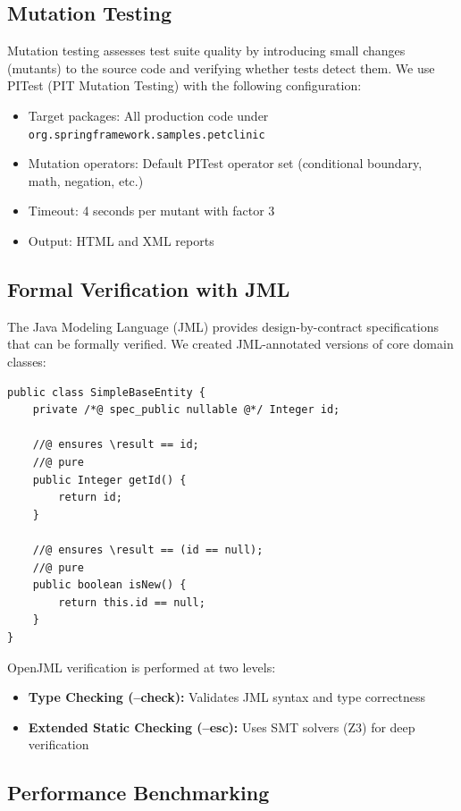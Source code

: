 \documentclass[sigconf]{acmart}
\begin{document}
\subsection{Mutation Testing}

Mutation testing assesses test suite quality by introducing small changes (mutants) to the source code and verifying whether tests detect them. We use PITest (PIT Mutation Testing) with the following configuration:
\begin{itemize}
    \item Target packages: All production code under \texttt{org.springframework.samples.petclinic}
    \item Mutation operators: Default PITest operator set (conditional boundary, math, negation, etc.)
    \item Timeout: 4 seconds per mutant with factor 3
    \item Output: HTML and XML reports
\end{itemize}

\subsection{Formal Verification with JML}

The Java Modeling Language (JML) provides design-by-contract specifications that can be formally verified. We created JML-annotated versions of core domain classes:

\begin{lstlisting}[style=javastyle, caption={JML Specification Example for BaseEntity}]
public class SimpleBaseEntity {
    private /*@ spec_public nullable @*/ Integer id;

    //@ ensures \result == id;
    //@ pure
    public Integer getId() {
        return id;
    }

    //@ ensures \result == (id == null);
    //@ pure
    public boolean isNew() {
        return this.id == null;
    }
}
\end{lstlisting}

OpenJML verification is performed at two levels:
\begin{itemize}
    \item \textbf{Type Checking (--check):} Validates JML syntax and type correctness
    \item \textbf{Extended Static Checking (--esc):} Uses SMT solvers (Z3) for deep verification
\end{itemize}

\subsection{Performance Benchmarking}
\end{document}
